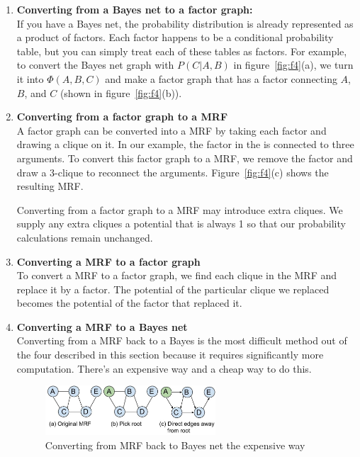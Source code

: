 \documentclass[twoside]{article}
\begin{document}
\begin{enumerate}
\item \textbf{Converting from a Bayes net to a factor graph:} \\
If you have a Bayes net, the probability distribution is already represented as a product of factors.
Each factor happens to be a conditional probability table, but you can simply treat each of these tables as factors.
For example, to convert the Bayes net graph with $P(C|A,B)$ in figure~\ref{fig:f4}(a), we turn it into $\Phi(A,B,C)$ and make
a factor graph that has a factor connecting $A$, $B$, and $C$ (shown in figure~\ref{fig:f4}(b)).

\item \textbf{Converting from a factor graph to a MRF} \\
A factor graph can be converted into a MRF by taking each factor and drawing a clique on it. 
In our example, the factor in the is connected to three arguments.
To convert this factor graph to a MRF, we remove the factor and draw a 3-clique to reconnect the arguments.
Figure~\ref{fig:f4}(c) shows the resulting MRF.

Converting from a factor graph to a MRF may introduce extra cliques.
We supply any extra cliques a potential that is always 1 so that our probability calculations remain unchanged.

\item \textbf{Converting a MRF to a factor graph} \\
To convert a MRF to a factor graph, we find each clique in the MRF and replace it by a factor.
The potential of the particular clique we replaced becomes the potential of the factor that replaced it.

\item \textbf{Converting a MRF to a Bayes net} \\
Converting from a MRF back to a Bayes is the most difficult method out of the four described in this section
because it requires significantly more computation.
There's an expensive way and a cheap way to do this.

\begin{figure}[h]
\caption{Converting from MRF back to Bayes net the expensive way}
\label{fig:f5}
\centering
\includegraphics[width=0.6\textwidth]{exp}
\end{figure}


\end{enumerate}
\end{document}

